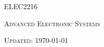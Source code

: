 \documentclass[a4paper,11pt]{article}
\begin{document}

\begin{center}
    {\scshape\huge ELEC2216\par} \vspace{0.5cm}
    {\scshape\Large Advanced Electronic Systems\par} \vspace{2cm}
    {\scshape Updated: \today}
\end{center}
\pagebreak

\tableofcontents \pagebreak




\end{document}
